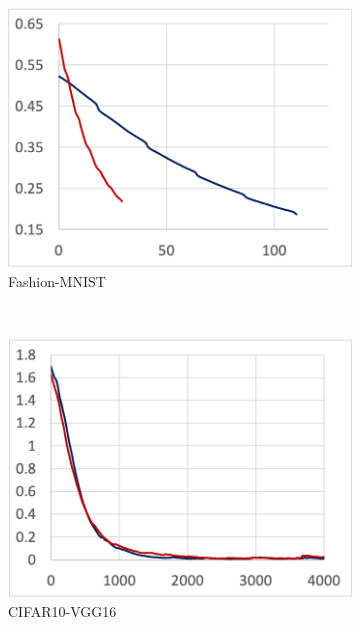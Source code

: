 \begin{figure}
\begin{subfigure}[t]{.24\textwidth}
    \includegraphics[width=\textwidth]{tf2-05}
    \caption{Fashion-MNIST}
  \end{subfigure}
  ~
  \begin{subfigure}[t]{.24\textwidth}
    \includegraphics[width=\textwidth]{tf2-06}
    \caption{CIFAR10-VGG16}
  \end{subfigure}
  \par\bigskip
  \begin{subfigure}[t]{.24\textwidth}

\end{subfigure}
\end{figure}
